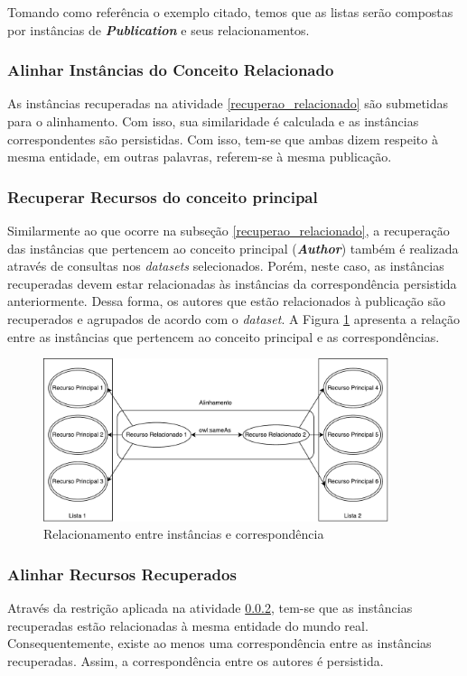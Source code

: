 Tomando como referência o exemplo citado, temos que as listas serão compostas por instâncias de \textbf{\textit{Publication}} e seus relacionamentos.

\subsubsection{Alinhar Instâncias do Conceito Relacionado}
\label{lista_rel}

As instâncias recuperadas na atividade \ref{recuperao_relacionado} são submetidas para o alinhamento. Com isso, sua similaridade é calculada e as instâncias correspondentes são persistidas. Com isso, tem-se que ambas dizem respeito à mesma entidade, em outras palavras, referem-se à mesma publicação.


\subsubsection{Recuperar Recursos do conceito principal}
\label{recuperao_principal}

Similarmente ao que ocorre na subseção \ref{recuperao_relacionado}, a recuperação  das instâncias que pertencem ao conceito principal (\textbf{\textit{Author}}) também é realizada através de consultas nos \textit{datasets} selecionados. Porém, neste caso, as instâncias recuperadas devem estar relacionadas às instâncias da correspondência persistida anteriormente. Dessa forma, os autores que estão relacionados à publicação são recuperados e agrupados de acordo com o \textit{dataset}. A Figura \ref{fig:relacionados} apresenta a relação entre as instâncias que pertencem ao conceito principal e as correspondências.

\begin{figure}[!h]
	\centering
	\includegraphics[width=0.9\textwidth]{./imagens/relacionados.pdf}
	\caption{Relacionamento entre instâncias e correspondência}
	\label{fig:relacionados}
\end{figure}

\subsubsection{Alinhar Recursos Recuperados}

Através da restrição aplicada na atividade \ref{recuperao_principal}, tem-se que as instâncias recuperadas estão relacionadas à mesma entidade do mundo real. Consequentemente, existe ao menos uma correspondência entre as instâncias recuperadas. Assim, a correspondência entre os autores é persistida. 


